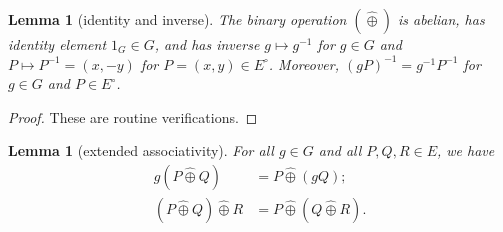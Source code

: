 \documentclass[12pt]{article}
\newtheorem{lemma}[theorem]{Lemma}
\newcommand{\Eoo}{E^{\circ}}
\newcommand{\hplus}{\hat\oplus}
\newcommand{\Go}{\langle\rho\rangle}
\begin{document}
\begin{lemma}[identity and inverse]\label{lemma:inv2} 
The binary operation $(\hplus)$ is abelian, has identity
  element $1_G\in G$, and has inverse $g\mapsto g^{-1}$ for $g\in G$
  and $P\mapsto P^{-1} = (x,-y)$ for $P=(x,y)\in \Eoo$.  Moreover, $(g
  P)^{-1} = g^{-1} P^{-1}$ for $g\in G$ and $P\in \Eoo$.
\end{lemma}

\begin{proof} These are routine verifications.
\end{proof}


\begin{lemma}[extended associativity]\label{lemma:pseudo} 
  For all $g\in G$ and all $P,Q,R\in E$, we have
\begin{align}
g (P\hplus Q) &= P\hplus (g Q);\\
(P\hplus Q)\hplus R &= P \hplus (Q\hplus R).
\end{align}
\end{lemma}
\end{document}
